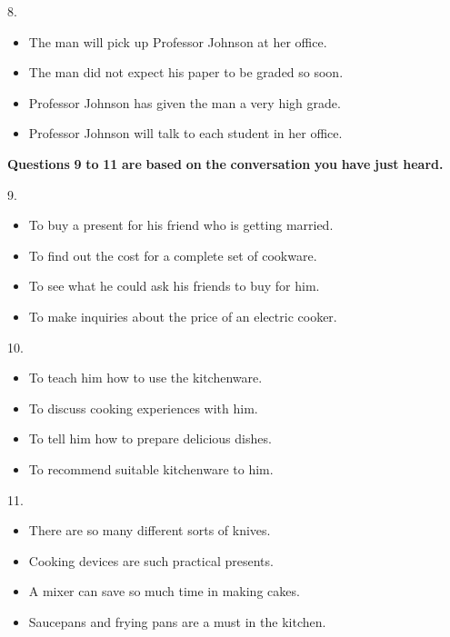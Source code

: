 \documentclass[UTF8,11pt]{ctexart}
\begin{document}
8.


\begin{itemize}[leftmargin=2em,itemsep=.2em,topsep=.4em]\item[A.] The man will pick up Professor Johnson at her office.
\item[B.] The man did not expect his paper to be graded so soon.
\item[C.] Professor Johnson has given the man a very high grade.
\item[D.] Professor Johnson will talk to each student in her office.
\end{itemize}

\textbf{Questions} \textbf{9} \textbf{to} \textbf{11} \textbf{are} \textbf{based} \textbf{on} \textbf{the} \textbf{conversation} \textbf{you} \textbf{have} \textbf{just} \textbf{heard.}


9.


\begin{itemize}[leftmargin=2em,itemsep=.2em,topsep=.4em]\item[A.] To buy a present for his friend who is getting married.
\item[B.] To find out the cost for a complete set of cookware.
\item[C.] To see what he could ask his friends to buy for him.
\end{itemize}

\begin{itemize}[leftmargin=2em,itemsep=.2em,topsep=.4em]\item[D.] To make inquiries about the price of an electric cooker.
\end{itemize}

10.


\begin{itemize}[leftmargin=2em,itemsep=.2em,topsep=.4em]\item[A.] To teach him how to use the kitchenware.
\item[B.] To discuss cooking experiences with him.
\item[C.] To tell him how to prepare delicious dishes.
\item[D.] To recommend suitable kitchenware to him.
\end{itemize}

11.


\begin{itemize}[leftmargin=2em,itemsep=.2em,topsep=.4em]\item[A.] There are so many different sorts of knives.
\item[B.] Cooking devices are such practical presents.
\item[C.] A mixer can save so much time in making cakes.
\item[D.] Saucepans and frying pans are a must in the kitchen.
\end{itemize}
\end{document}

